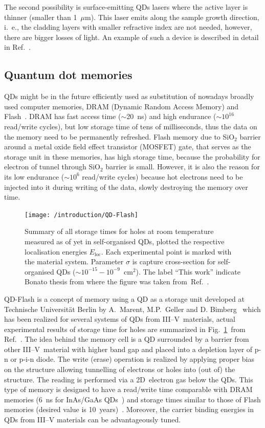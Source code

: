 \documentclass[
a4paper, %
11pt, %
onecolumn, %
openany, %
oldfontcommands,
]{memoir}
\begin{document}
The second possibility is surface-emitting QDs lasers where the active layer is thinner (smaller than 1~$\mu$m). This laser emits along the sample growth direction, i.~e., the cladding layers with smaller refractive index are not needed, however, there are bigger losses of light. An example of such a device is described in detail in Ref.~\cite{Saito}.



\subsection*{Quantum dot memories}
QDs might be in the future efficiently used as substitution of nowadays broadly used computer memories, DRAM (Dynamic Random Access Memory) and Flash~\cite{Pavan,Sherwin}. DRAM has fast access time ($\sim$20~ns) and high endurance ($\sim10^{16}$ read/write cycles), but low storage time of tens of milliseconds, thus the data on the memory need to be permanently refreshed. Flash memory due to SiO$_2$ barrier around a metal oxide field effect transistor (MOSFET) gate, that serves as the storage unit in these memories, has high storage time, because the probability for electron of tunnel through SiO$_2$ barrier is small. However, it is also the reason for its low endurance ($\sim 10^{6}$ read/write cycles) because hot electrons need to be injected into it during writing of the data, slowly destroying the memory over time. 
%
\begin{figure}
	\centering
	\texttt{[image: /introduction/QD-Flash]}
	\caption{Summary of all storage times for holes at room temperature measured as of yet in self-organised QDs, plotted the respective localisation energies $E_\mathrm{loc}$. Each experimental point is marked with the material system. Parameter $\sigma$ is capture cross-section for self-organised QDs ($\sim10^{ -15} -10^ {-9}$~cm$^2$). The label \enquote{This work} indicate Bonato thesis from where the figure was taken from~Ref.~\cite{t_bonato}.}
	\label{fig:intr:QD-flash}
\end{figure}

QD-Flash is a concept of memory using a QD as a storage unit developed at Technische Universität Berlin by A.~Marent, M.P.~Geller and D. Bimberg~\cite{Marent_SST2011_QDFlash} which has been realized for several systems of QDs from III--V~materials, actual experimental results of storage time for holes are summarized in Fig.~\ref{fig:intr:QD-flash}~from Ref.~\cite{t_bonato}. The idea behind the memory cell is a QD surrounded by a barrier from other III--V~material with higher band gap and placed into a depletion layer of p-n or p-i-n diode. The write (erase) operation is realized by applying proper bias on the structure allowing tunnelling of electrons or holes into (out of) the structure. The reading is performed via a 2D~electron gas below the QDs. This type of memory is designed to have a read/write time comparable with DRAM memories (6~ns for InAs/GaAs QDs~\cite{GellerAPL}) and storage times similar to those of Flash memories (desired value is 10~years)~\cite{GellerAPL,GellerJOP}. Moreover, the carrier binding energies in QDs from III--V materials can be advantageously tuned. 
\end{document}

